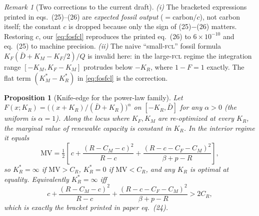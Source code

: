 \documentclass[11pt,reqno]{amsart}
\theoremstyle{plain}
\newtheorem{proposition}{Proposition}
\theoremstyle{definition}
\theoremstyle{remark}
\newtheorem{remark}{Remark}
\newcommand{\KR}{K_R}
\newcommand{\KF}{K_F}
\newcommand{\KM}{K_M}
\newcommand{\KRs}{K_R^{*}}
\newcommand{\KMs}{K_M^{*}}
\newcommand{\Dbar}{\bar D}
\newcommand{\CM}{C_M}
\newcommand{\CF}{C_F}
\newcommand{\CR}{C_R}
\newcommand{\bp}{\beta+p}
\begin{document}
\begin{remark}[Two corrections to the current draft]\label{rem:corr}
\emph{(i)} The bracketed expressions printed in eqs.\ (25)--(26) are
\emph{expected fossil output} ($=\text{carbon}/c$), not carbon itself; the
constant $c$ is dropped because only the sign of (25)$-$(26) matters. Restoring
$c$, our \eqref{eq:fosfcl} reproduces the printed eq.\ (26) to $6\times10^{-10}$
and eq.\ (25) to machine precision.
\emph{(ii)} The naive ``small-\textsc{fcl}'' fossil formula
$\KF(\Dbar+\KM-\KF/2)/Q$ is invalid here: in the large-\textsc{fcl} regime the
integration range $[-\KM,\KF-\KM]$ protrudes below $-\KR$, where $1-F=1$
exactly. The flat term $(\KMs-\KRs)$ in \eqref{eq:fosfcl} is the correction.
\end{remark}

\begin{proposition}[Knife-edge for the power-law family]\label{prop:knife}
Let $F(x;\KR)=\big((x+\KR)/(\Dbar+\KR)\big)^{\alpha}$ on $[-\KR,\Dbar]$ for any
$\alpha>0$ (the uniform is $\alpha=1$). Along the locus where $\KF,\KM$ are
re-optimized at every $\KR$, the marginal value of renewable capacity is
\emph{constant in $\KR$}. In the interior regime it equals
\begin{equation}\label{eq:mv}
  \mathrm{MV}=\tfrac12\!\left[\,c
  +\frac{(R-\CM-c)^2}{R-c}
  +\frac{(R-c-\CF-\CM)^2}{\bp-R}\right],
\end{equation}
so $\KRs=\infty$ if $\mathrm{MV}>\CR$, $\KRs=0$ if $\mathrm{MV}<\CR$, and any
$\KR$ is optimal at equality. Equivalently $\KRs=\infty$ iff
\begin{equation}\label{eq:eq24}
  c+\frac{(R-\CM-c)^2}{R-c}+\frac{(R-c-\CF-\CM)^2}{\bp-R}>2\CR ,
\end{equation}
which is \emph{exactly} the bracket printed in paper eq.\ (24).
\end{proposition}
\end{document}
